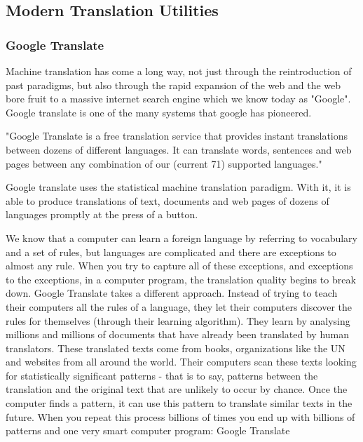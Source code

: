 \documentclass[12pt,a4paper]{article}
\begin{document}
\newpage

\subsection{Modern Translation Utilities}

\subsubsection{Google Translate}

Machine translation has come a long way, not just through the reintroduction of past paradigms, but also through the rapid
expansion of the web and the web bore fruit to a massive internet search engine which we know today as "Google".
Google translate is one of the many systems that google has pioneered.

"Google Translate is a free translation service that provides instant translations 
between dozens of different languages. It can translate words, sentences and web pages between 
any combination of our (current 71) supported languages."\cite{Google Translate}

Google translate uses the statistical machine translation paradigm. With it, it is able to produce translations of text, documents and web pages of dozens of languages promptly at the press of a button. 

We know that a computer can learn a foreign language by referring to vocabulary and a set of rules, but languages are complicated and there are exceptions to almost any rule. 
When you try to capture all of these exceptions, and exceptions to the exceptions, in a computer program, the translation quality begins to break down.
Google Translate takes a different approach. 
Instead of trying to teach their computers all the rules of a language, they let their computers discover the rules for themselves (through their learning algorithm). They learn by analysing millions and millions of documents that have already been translated by human translators. These translated texts come from books, organizations like the UN and websites from all around the world.
Their computers scan these texts looking for statistically significant patterns - that is to say, patterns between the translation and the original text that are unlikely to occur by chance. Once the computer finds a pattern, it can use this pattern to translate similar texts in the future. When you repeat this process billions of times you end up with billions of patterns and one very smart computer program: Google Translate
\end{document}
